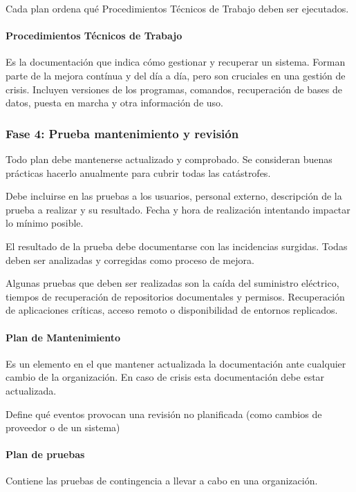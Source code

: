             Cada plan ordena qué Procedimientos Técnicos de Trabajo deben ser ejecutados.

        \paragraph{Procedimientos Técnicos de Trabajo}
            Es la documentación que indica cómo gestionar y recuperar un sistema. Forman parte de la mejora contínua y del día a día, pero son cruciales en una gestión de crisis. Incluyen versiones de los programas, comandos, recuperación de bases de datos, puesta en marcha y otra información de uso.

    \subsubsection{Fase 4: Prueba mantenimiento y revisión} %
        Todo plan debe mantenerse actualizado y comprobado. Se consideran buenas prácticas hacerlo anualmente para cubrir todas las catástrofes.
        
        Debe incluirse en las pruebas a los usuarios, personal externo, descripción de la prueba a realizar y su resultado. Fecha y hora de realización intentando impactar lo mínimo posible.

        El resultado de la prueba debe documentarse con las incidencias surgidas. Todas deben ser analizadas y corregidas como proceso de mejora. 

        Algunas pruebas que deben ser realizadas son la caída del suministro eléctrico, tiempos de recuperación de repositorios documentales y permisos. Recuperación de aplicaciones críticas, acceso remoto o disponibilidad de entornos replicados.

        \paragraph{Plan de Mantenimiento}
            Es un elemento en el que mantener actualizada la documentación ante cualquier cambio de la organización. En caso de crisis esta documentación debe estar actualizada.

            Define qué eventos provocan una revisión no planificada (como cambios de proveedor o de un sistema)
        
        \paragraph{Plan de pruebas}
            Contiene las pruebas de contingencia a llevar a cabo en una organización.

